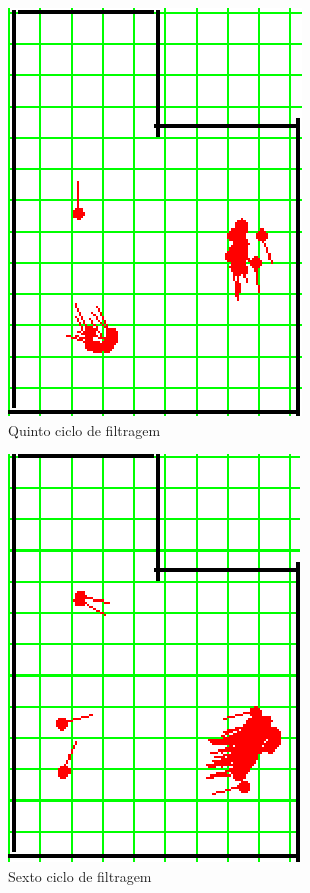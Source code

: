 \begin{figure}[H]
  \centering
  \includegraphics[scale=1]{figuras/cen2_ex5/6.eps}
  \caption[Quinto Ciclo de Filtragem]{Quinto ciclo de filtragem}
  \label{img:cen2_ex5_6}
\end{figure}

\begin{figure}[H]
  \centering
  \includegraphics[scale=1]{figuras/cen2_ex5/7.eps}
  \caption[Sexto Ciclo de Filtragem]{Sexto ciclo de filtragem}
  \label{img:cen2_ex5_7}
\end{figure}

